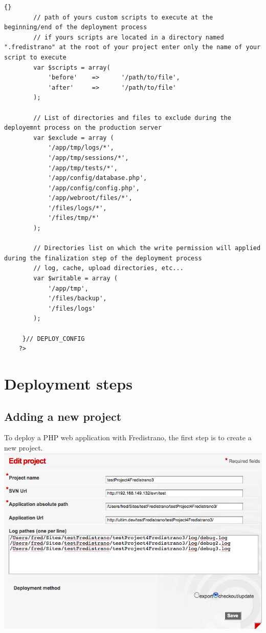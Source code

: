 \documentclass[12pt,a4paper]{report}
\begin{document}
\begin{itemize}
\begin{lstlisting}[frame=tb]{}
	 	// path of yours custom scripts to execute at the beginning/end of the deployment process
		// if yours scripts are located in a directory named ".fredistrano" at the root of your project enter only the name of your script to execute
	 	var $scripts = array(
	 		'before' 	=>		'/path/to/file', 
	 		'after' 	=>		'/path/to/file' 
	 	);

		// List of directories and files to exclude during the deployemnt process on the production server
		var $exclude = array (
			'/app/tmp/logs/*',
			'/app/tmp/sessions/*',
			'/app/tmp/tests/*',
			'/app/config/database.php',
			'/app/config/config.php',
			'/app/webroot/files/*',
			'/files/logs/*',
			'/files/tmp/*'
		);

		// Directories list on which the write permission will applied during the finalization step of the deployment process	
		// log, cache, upload directories, etc...
		var $writable = array (
			'/app/tmp',
			'/files/backup',
			'/files/logs'
		);

	 }// DEPLOY_CONFIG
	?>
\end{lstlisting}

\end{itemize}
\newpage

\section{Deployment steps}

\subsection{Adding a new project}

To deploy a PHP web application with Fredistrano, the first step is to create a new project.\\

\includegraphics[width=1\textwidth]{doc_fredistrano1.png} 
\end{document}
